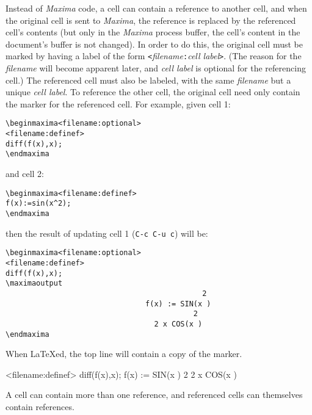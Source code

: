 \documentclass{article}
\newcommand{\mx}{\textsl{\sffamily Maxima}}
\begin{document}
\noindent
Instead of \mx{} code, a cell can contain a reference to another cell,
and when the original cell is sent to \mx{}, the reference is replaced
by the referenced cell's contents (but only in the \mx{} process
buffer, the cell's 
content in the document's buffer is not changed).  In order to do
this, the original cell must be marked by having a label of the form
\texttt{<}\textsl{filename}\texttt{:}\textsl{cell label}\texttt{>}.
(The reason for the \textsl{filename} will become apparent later, and
\textsl{cell label} is optional for the referencing cell.)
The referenced cell must also be labeled, with the same
\textsl{filename} but a unique \textsl{cell label}.  To reference the
other cell, the original cell need only contain the marker for the
referenced cell.  For example, given cell 1:
\begin{verbatim}
\beginmaxima<filename:optional>
<filename:definef>
diff(f(x),x);
\endmaxima
\end{verbatim}
\noindent
and cell 2:
\begin{verbatim}
\beginmaxima<filename:definef>
f(x):=sin(x^2);
\endmaxima
\end{verbatim}
\noindent
then the result of updating cell 1 (\texttt{C-c C-u c}) will be:
\begin{verbatim}
\beginmaxima<filename:optional>
<filename:definef>
diff(f(x),x);
\maximaoutput
                                             2
                                f(x) := SIN(x )
                                           2
                                  2 x COS(x )
\endmaxima
\end{verbatim}
\noindent
When \LaTeX{}ed, the top line will contain a copy of the marker.

<filename:definef>
diff(f(x),x);
                                f(x) := SIN(x )
                                           2
                                  2 x COS(x )
\endmaxima

A cell can contain more than one reference, and referenced cells can
themselves contain references.  
\end{document}
